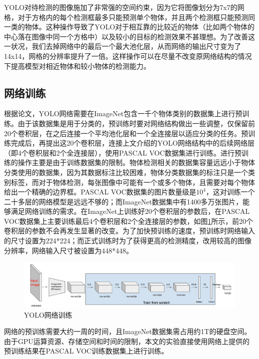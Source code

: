 YOLO对待检测的图像施加了非常强的空间约束，因为它将图像划分为7x7的网格，对于方格内的每个检测框最多只能预测单个物体，并且两个检测框只能预测同一类的物体。这种操作导致了YOLO对于相互靠的比较近的物体（比如两个物体的中心落在图像中同一个方格中）以及较小的目标的检测效果不甚理想。为了改善这一状况，我们去掉网络中的最后一个最大池化层，从而网络的输出尺寸变为了14x14，网格的分辨率提升了一倍。这样操作可以在尽量不改变原网络结构的情况下提高模型对相近物体和较小物体的检测能力。


\subsection{网络训练}
根据论文\cite{redmon2016you}，YOLO网络需要在ImageNet\cite{russakovsky2015imagenet}包含一千个物体类别的数据集上进行预训练。由于该数据集是用于分类的，预训练时要对网络结构做出一些调整，仅保留前20个卷积层，在之后连接一个平均池化层和一个全连接层以适应分类的任务。预训练完成后，再提出这20个卷积层，连接上文介绍的YOLO网络结构中的后续网络层（即4个卷积层和2个全连接层），使用PASCAL VOC数据集进行训练。进行预训练的操作主要是由于训练数据集的限制。物体检测相关的数据集容量远远小于物体分类使用的数据集，因为其数据标注比较困难，物体分类数据集的标注只是一个类别标签，而对于物体检测，每张图像中可能有一个或多个物体，且需要对每个物体给出一个精确的边界框。PASCAL VOC数据集的图片数量级是$10^4$，这对训练一个二十多层的网络模型是远远不够的；而ImageNet数据集中有1400多万张图片，能够满足网络训练的需求。在ImageNet上训练好20个卷积层的参数后，在PASCAL VOC数据集上主要训练最后4个卷积层和2个全连接层的参数，如图\ref{fig:3_2_网络训练}所示，前20个卷积层的参数不会再发生显著的改变。为了加快预训练的速度，预训练时网络输入的尺寸设置为224*224；而正式训练时为了获得更高的检测精度，改用较高的图像分辨率，网络输入尺寸被设置为448*448。

\begin{figure}[htb] %
	\centering
	\includegraphics[width=6.5in]{figures/3_2_网络训练}
	\caption{YOLO网络训练} \label{fig:3_2_网络训练}
\end{figure}

网络的预训练需要大约一周的时间，且ImageNet数据集需占用约1T的硬盘空间。由于GPU运算资源、存储空间和时间的限制，本文的实验直接使用网络上提供的预训练结果在PASCAL VOC训练数据集上进行训练。

